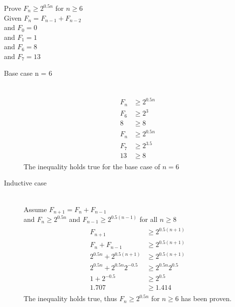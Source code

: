 \documentclass[paper=a4, fontsize=11pt]{scrartcl} %
\numberwithin{equation}{section} %
\numberwithin{figure}{section} %
\numberwithin{table}{section} %
\begin{document}
\begin{description}
\begin{description}
            Prove $F_n \geq 2^{0.5n}$ for $n \geq 6$ \\
            Given $F_n = F_{n - 1} + F_{n - 2}$ \\
            and $F_0 = 0$ \\
            and $F_1 = 1$ \\
            and $F_6 = 8$ \\
            and $F_7 = 13$ \\
            \begin{description}
            \item[Base case n = 6] \hfill \\
            \begin{align}
            \begin{split}
                F_n & \geq 2^{0.5n} \\
                F_6 & \geq 2^3 \\
                8 & \geq 8 \\
                F_n & \geq 2^{0.5n} \\
                F_7 & \geq 2^{3.5} \\
                13 & \geq 8
            \end{split}
            \end{align}
            The inequality holds true for the base case of $n = 6$
            \item[Inductive case] \hfill \\
            Assume $F_{n + 1} = F_n + F_{n - 1}$ \\
            and $F_n \geq 2^{0.5n}$ and $F_{n - 1} \geq 2^{0.5(n - 1)}$ for all $n \geq 8$ \\
            \begin{align}
            \begin{split}
                F_{n + 1} & \geq 2^{0.5(n + 1)} \\
                F_n + F_{n - 1} & \geq 2^{0.5(n + 1)} \\
                2^{0.5n} + 2^{0.5(n + 1)} & \geq 2^{0.5(n + 1)} \\
                2^{0.5n} + 2^{0.5n}2^{-0.5} & \geq 2^{0.5n}2^{0.5} \\
                1 + 2^{-0.5} & \geq 2^{0.5} \\
                1.707 & \geq 1.414
            \end{split}
            \end{align}
            The inequality holds true, thus $F_n \geq 2^{0.5n}$ for $n \geq 6$ has been proven.

\end{description}
\end{description}
\end{description}
\end{document}
